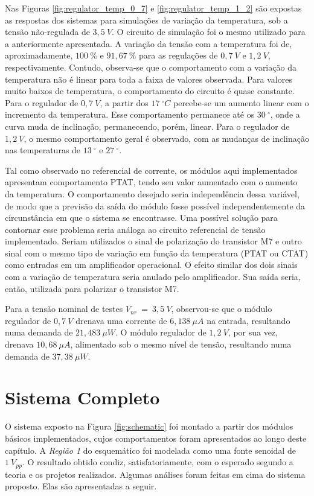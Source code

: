 Nas Figuras \ref{fig:regulator_temp_0_7} e \ref{fig:regulator_temp_1_2} são expostas as respostas dos sistemas para simulações de variação da temperatura, sob a tensão não-regulada de $3,5~V$. O circuito de simulação foi o mesmo utilizado para a anteriormente apresentada. A variação da tensão com a temperatura foi de, aproximadamente, $100~\%$ e $91,67~\%$ para as regulações de $0,7~V$ e $1,2~V$, respectivamente. Contudo, observa-se que o comportamento com a variação da temperatura não é linear para toda a faixa de valores observada. Para valores muito baixos de temperatura, o comportamento do circuito é quase constante. Para o regulador de $0,7~V$, a partir dos $17~^{\circ}C$ percebe-se um aumento linear com o incremento da temperatura. Esse comportamento permanece até os $30~^{\circ}$, onde a curva muda de inclinação, permanecendo, porém, linear. Para o regulador de $1,2~V$, o mesmo comportamento geral é observado, com as mudanças de inclinação nas temperaturas de $13~^{\circ}$ e $27~^{\circ}$.

Tal como observado no referencial de corrente, os módulos aqui implementados apresentam comportamento {PTAT}, tendo seu valor aumentado com o aumento da temperatura. O comportamento desejado seria independência dessa variável, de modo que a previsão da saída do módulo fosse possível independentemente da circunstância em que o sistema se encontrasse. Uma possível solução para contornar esse problema seria análoga ao circuito referencial de tensão implementado. Seriam utilizados o sinal de polarização do transistor {M7} e outro sinal com o mesmo tipo de variação em função da temperatura ({PTAT} ou {CTAT}) como entradas em um amplificador operacional. O efeito similar dos dois sinais com a variação de temperatura seria anulado pelo amplificador. Sua saída seria, então, utilizada para polarizar o transistor {M7}.

Para a tensão nominal de testes $V_{nr}~=~3,5~V$, observou-se que o módulo regulador de $0,7~V$ drenava uma corrente de $6,138~\mu A$ na entrada, resultando numa demanda de $21,483~\mu W$. O módulo regulador de $1,2~V$, por sua vez, drenava $10,68~\mu A$, alimentado sob o mesmo nível de tensão, resultando numa demanda de $37,38~\mu W$.


\section{Sistema Completo}
O sistema exposto na Figura \ref{fig:schematic} foi montado a partir dos módulos básicos implementados, cujos comportamentos foram apresentados ao longo deste capítulo. A \textit{Região 1} do esquemático foi modelada como uma fonte senoidal de $1~V_{pp}$. O resultado obtido condiz, satisfatoriamente, com o esperado segundo a teoria e os projetos realizados. Algumas análises foram feitas em cima do sistema proposto. Elas são apresentadas a seguir.

